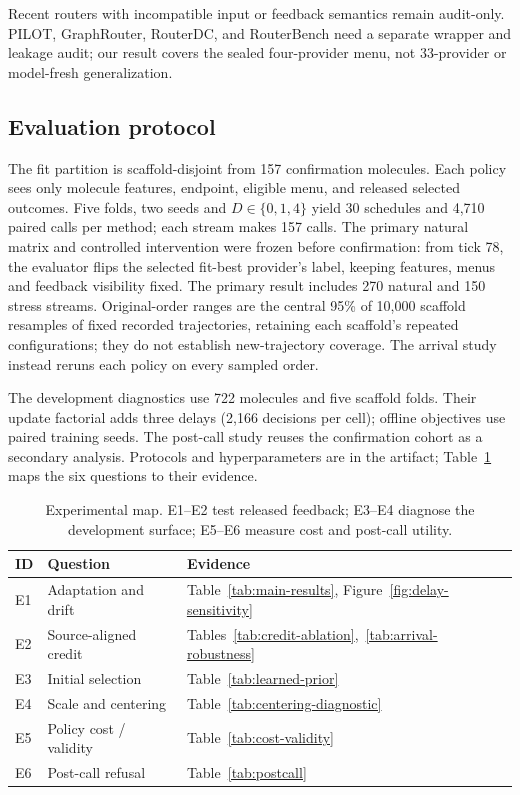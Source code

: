 \documentclass[sigconf,anonymous]{aamas}
\newcommand{\MiraTableFont}{\fontsize{9}{11}\selectfont}
\begin{document}
Recent routers with incompatible input or feedback semantics remain audit-only. PILOT, GraphRouter, RouterDC, and RouterBench need a separate wrapper and leakage audit; our result covers the sealed four-provider menu, not 33-provider or model-fresh generalization.

\subsection{Evaluation protocol}
The fit partition is scaffold-disjoint from 157 confirmation molecules. Each policy sees only molecule features, endpoint, eligible menu, and released selected outcomes. Five folds, two seeds and $D\in\{0,1,4\}$ yield 30 schedules and 4,710 paired calls per method; each stream makes 157 calls. The primary natural matrix and controlled intervention were frozen before confirmation: from tick 78, the evaluator flips the selected fit-best provider's label, keeping features, menus and feedback visibility fixed. The primary result includes 270 natural and 150 stress streams. Original-order ranges are the central 95\% of 10,000 scaffold resamples of fixed recorded trajectories, retaining each scaffold's repeated configurations; they do not establish new-trajectory coverage. The arrival study instead reruns each policy on every sampled order.

The development diagnostics use 722 molecules and five scaffold folds. Their update factorial adds three delays (2,166 decisions per cell); offline objectives use paired training seeds. The post-call study reuses the confirmation cohort as a secondary analysis. Protocols and hyperparameters are in the artifact; Table~\ref{tab:matrix} maps the six questions to their evidence.

\begin{table}[t]
\caption{Experimental map. E1--E2 test released feedback; E3--E4 diagnose the development surface; E5--E6 measure cost and post-call utility.}
\label{tab:matrix}
\MiraTableFont
\setlength{\tabcolsep}{3pt}
\begin{tabular}{@{}llp{}@{}}
\toprule
ID & Question & Evidence \\
\midrule
E1 & Adaptation and drift & Table~\ref{tab:main-results}, Figure~\ref{fig:delay-sensitivity} \\
E2 & Source-aligned credit & Tables~\ref{tab:credit-ablation},~\ref{tab:arrival-robustness} \\
E3 & Initial selection & Table~\ref{tab:learned-prior} \\
E4 & Scale and centering & Table~\ref{tab:centering-diagnostic} \\
E5 & Policy cost / validity & Table~\ref{tab:cost-validity} \\
E6 & Post-call refusal & Table~\ref{tab:postcall} \\
\bottomrule
\end{tabular}
\end{table}
\end{document}
